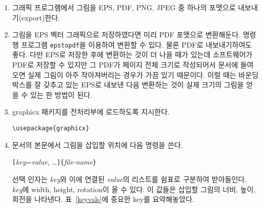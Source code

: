 \begin{enumerate} \firmlist 
\item 그래픽 프로그램에서 그림을 EPS, PDF, PNG, JPEG 중 하나의 포맷으로 내보내기(export)한다.
\item 그림을 EPS 벡터 그래픽으로 저장하였다면 미리 PDF 포맷으로 변환해둔다. 명령행 프로그램 \texttt{epstopdf}을 이용하여 변환할 수 있다. 
물론 PDF로 내보내기하여도 좋다. 다만 
EPS로 저장한 후에 변환하는 것이 더 나을 때가 있는데 소프트웨어가 PDF로 저장할 수 있지만 그 PDF가 페이지 전체 크기로 작성되어서 문서에 들여오면 실제 그림이 아주 작아져버리는 경우가 가끔 있기 때문이다. 이럴 때는 바운딩박스를 잘 갖추고 있는 EPS로 내보낸 다음 변환하는 것이 실제 크기의 그림을 얻을 수 있는 한 방법이 된다.
\item \textsf{graphicx} 패키지를 전처리부에 로드하도록 지시한다.
\begin{lscommand}
  \verb|\usepackage{graphicx}|
\end{lscommand}
\item 문서의 본문에서 그림을 삽입할 위치에 다음 명령을 쓴다.
\begin{lscommand}
\verb|[|\emph{key}=\emph{value}, \ldots\verb|]{|\emph{file-name}\verb|}|
\end{lscommand}
\noindent 선택 인자는 \emph{key}와 이에 연결된 \emph{value}의 리스트를 쉼표로 구분하여 받아들인다. \emph{key}에 
width, height, rotation이 올 수 있다. 이 값들은 삽입할 그림의 너비, 높이, 회전을 나타낸다. 표~\ref{keyvals}에
중요한 key를 요약해놓았다.
\end{enumerate}

